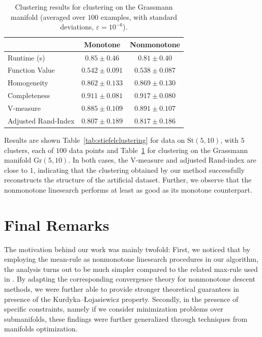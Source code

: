 \documentclass[a4paper, 12pt]{article}
\numberwithin{equation}{section}
\theoremstyle{bolddef}
\theoremstyle{definition}
\theoremstyle{boldplain}
\begin{document}
\begin{table}[ht]
\centering
\begin{tabular}{lcc}
\toprule
 & Monotone & Nonmonotone \\
\midrule
Runtime (s) & $0.85 \pm 0.46$ & $0.81 \pm 0.40$ \\
Function Value & $0.542 \pm 0.091$ & $0.538 \pm 0.087$ \\
Homogeneity & $0.862 \pm 0.133$ & $0.869 \pm 0.130$ \\
Completeness & $0.911 \pm 0.081$ & $0.917 \pm 0.080$ \\
V-measure & $0.885 \pm 0.109$ & $0.891 \pm 0.107$ \\
Adjusted Rand-Index & $0.807 \pm 0.189$ & $0.817 \pm 0.186$ \\
\bottomrule
\end{tabular}
	\caption{Clustering results for clustering on the Grassmann manifold (averaged over $100$ examples, with standard deviations, $\varepsilon = 10^{-6}$).}
\label{tab:grassmannclustering}
\end{table}

Results are shown Table~\ref{tab:stiefelclustering} for data on $\mathrm{St}(5, 10)$, with $5$ clusters, each of $100$ data points and Table~\ref{tab:grassmannclustering} for clustering on the Grassmann manifold $\mathrm{Gr}(5, 10)$. In both cases, the V-measure and adjusted Rand-index are close to $1$, indicating that the clustering obtained by our method successfully reconstructs the structure of the artificial dataset. Further, we observe that the nonmonotone linesearch performs at least as good as its monotone counterpart.

\section{Final Remarks}\label{Sec:Final}

The motivation behind our work was mainly twofold: First, we noticed that by employing the mean-rule as nonmonotone linesearch procedures in our algorithm, the analysis turns out to be much simpler compared to the related max-rule used in \cite{aragon2025}. By adapting the corresponding convergence theory for nonmonotone descent methods, we were further able to provide stronger theoretical guarantees in presence of the Kurdyka–Łojasiewicz property. Secondly, in the presence of specific constraints, namely if we consider minimization problems over submanifolds, these findings were further generalized through techniques from manifolds optimization. 
\end{document}
